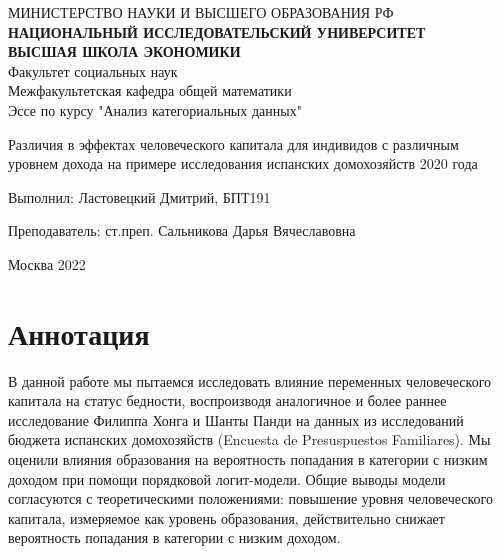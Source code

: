 \documentclass[a4paper]{article}
\begin{document}
\renewcommand{\cftsecleader}{\cftdotfill{\cftdotsep}}
\def\contentsname{Оглавление}
	\begin{center}
		\hfill \break
		\large{МИНИСТЕРСТВО НАУКИ И ВЫСШЕГО ОБРАЗОВАНИЯ РФ}\\
		\small{\textbf{НАЦИОНАЛЬНЫЙ ИССЛЕДОВАТЕЛЬСКИЙ УНИВЕРСИТЕТ}}\\
		\small{\textbf{ВЫСШАЯ ШКОЛА ЭКОНОМИКИ}}\\		
		\normalsize{Факультет социальных наук}\\
		\normalsize{Межфакультетская кафедра общей математики}\\
				\hfill \break
		Эссе по курсу "Анализ категориальных данных"\\
		\hfill\break
		\hfill \break
		\hfill \break
		\hfill \break
		\hfill \break

		\large{Различия в эффектах человеческого капитала для индивидов с различным уровнем дохода на примере исследования испанских домохозяйств 2020 года}\\
		\hfill \break
		\hfill \break

		\normalsize 

		\end{center}
		\begin{flushright}
			Выполнил: Ластовецкий Дмитрий, БПТ191
			
			Преподаватель: ст.преп. Сальникова Дарья Вячеславовна
		\end{flushright}
		\hfill \break
	\hfill \break
	
	\hfill \break
	\hfill \break
		\hfill \break
	\begin{center} Москва 2022 \end{center}
	\thispagestyle{empty} %
	
	
	\newpage
	
\tableofcontents %

	\newpage
\normalsize
\section*{Аннотация}

В данной работе мы пытаемся исследовать влияние переменных человеческого капитала на статус бедности, воспроизводя аналогичное и более раннее исследование Филиппа Хонга и Шанты Панди на данных из исследований бюджета испанских домохозяйств (Encuesta de Presuspuestos Familiares). Мы оценили влияния образования на вероятность попадания в категории с низким доходом при помощи порядковой логит-модели. Общие выводы модели согласуются с теоретическими положениями: повышение уровня человеческого капитала, измеряемое как уровень образования, действительно снижает вероятность попадания в категории с низким доходом.   
\newpage
\end{document}
